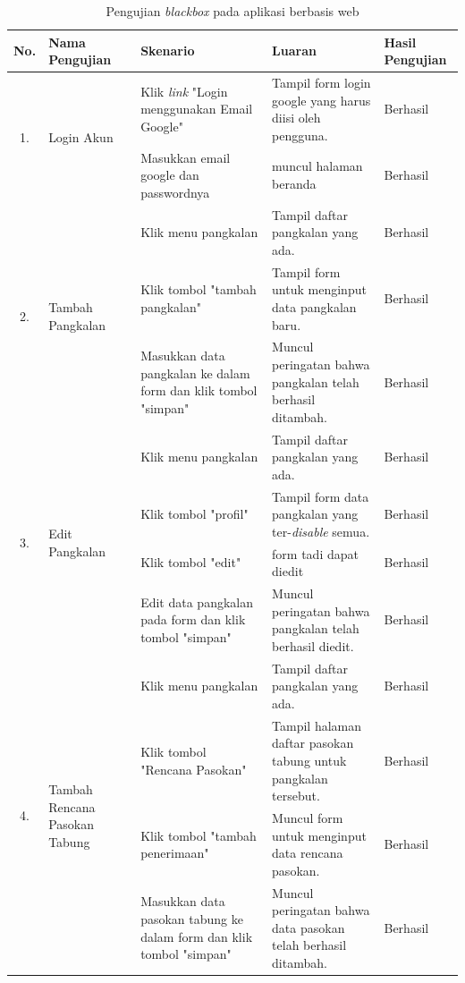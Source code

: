 	\begin{longtable}{ |c|p{3cm}|p{3cm}|p{3cm}|p{2cm}|}
	\caption{Pengujian \textit{blackbox} pada aplikasi berbasis web}
	\label{ujiWeb} \\ \hline
	\textbf{No.}                  &  \textbf{Nama Pengujian}         & \textbf{Skenario}                                       & \textbf{Luaran}              & \textbf{Hasil Pengujian} \\ \hline
	
	
	\multirow{2}{*}{1.}  & 	\multirow{2}{*}{Login Akun} & Klik \textit{link} "Login menggunakan Email Google"           & Tampil form login google yang harus diisi oleh pengguna.             & Berhasil \\ \cline{3-5}
	& & Masukkan email google dan passwordnya           & muncul halaman beranda         & Berhasil \\ \hline
	
	\multirow{3}{*}{2.}  & 	\multirow{3}{*}{Tambah Pangkalan} & Klik menu pangkalan           & Tampil daftar pangkalan yang ada.             & Berhasil \\ \cline{3-5}
	& & Klik tombol "tambah pangkalan"           & Tampil form untuk menginput data pangkalan baru.             & Berhasil \\ \cline{3-5}
	& & Masukkan data pangkalan ke dalam form dan klik tombol "simpan"           & Muncul peringatan bahwa pangkalan telah berhasil ditambah.             & Berhasil \\ \hline
	
	\multirow{4}{*}{3.}  & 	\multirow{4}{*}{Edit Pangkalan} & Klik menu pangkalan           & Tampil daftar pangkalan yang ada.             & Berhasil \\ \cline{3-5}
	& & Klik tombol "profil"           & Tampil form data pangkalan yang ter-\textit{disable} semua.             & Berhasil \\ \cline{3-5}
	& & Klik tombol "edit"           & form tadi dapat diedit             & Berhasil \\ \hline
	& & Edit data pangkalan pada form dan klik tombol "simpan"           & Muncul peringatan bahwa pangkalan telah berhasil diedit.             & Berhasil \\ \hline
	
	
	\multirow{4}{*}{4.}  & 	\multirow{4}{*}{\parbox{3cm}{\centering Tambah Rencana Pasokan Tabung}} & Klik menu pangkalan           & Tampil daftar pangkalan yang ada.             & Berhasil \\ \cline{3-5}
	& & Klik tombol "Rencana Pasokan"           & Tampil halaman daftar pasokan tabung untuk pangkalan tersebut.             & Berhasil \\ \cline{3-5}
	& & Klik tombol "tambah penerimaan"           & Muncul form untuk menginput data rencana pasokan.             & Berhasil \\ \cline{3-5}
	& & Masukkan data pasokan tabung ke dalam form dan klik tombol "simpan"     & Muncul peringatan bahwa data pasokan telah berhasil ditambah.             & Berhasil \\ \hline
	

\end{longtable}
